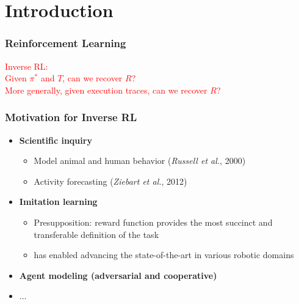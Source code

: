 \section{Introduction}

\begin{frame}
	\frametitle{Reinforcement Learning}
	
	\begin{center}
	\end{center}
	
	\vspace{-0.5cm}
	
	\textcolor{red}{Inverse RL:} \\
	\hspace{1cm}\textcolor{red}{Given $ \pi^* $ and $ T $, can we recover $ R $?\\
	\hspace{1cm}More generally, given execution traces, can we recover $ R $?}
\end{frame}

\begin{frame}
	\frametitle{Motivation for Inverse RL}
	
	\Large
	
	\vspace{0.3cm}
	
	\begin{itemize}
		\item \textbf{Scientific inquiry}
			  \begin{itemize}
				  \item Model animal and human behavior (\emph{Russell et al.}, 2000)
				  \vspace{0.15cm}
				  \item Activity forecasting (\emph{Ziebart et al.}, 2012)
			  \end{itemize}
		\vspace{0.2cm}
		\item \textbf{Imitation learning}
			  \begin{itemize}
				  \item Presupposition: reward function provides the most succinct and
				  		transferable definition of the task
				  \vspace{0.15cm}
				  \item has enabled advancing the state-of-the-art in various robotic domains
			  \end{itemize}
		\vspace{0.2cm}
		\item \textbf{Agent modeling (adversarial and cooperative)}
		\vspace{0.2cm}
		\item ...
	\end{itemize}
\end{frame}
